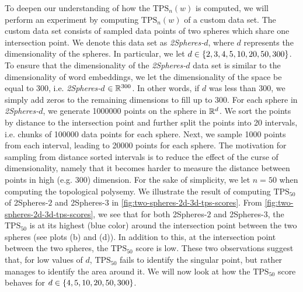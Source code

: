To deepen our understanding of how the $\text{TPS}_n(w)$ is computed, we will perform an experiment by computing $\text{TPS}_n(w)$ of a custom data set. The custom data set consists of sampled data points of two spheres which share one intersection point. We denote this data set as \textit{2Spheres-$d$}, where $d$ represents the dimensionality of the spheres. In particular, we let $d \in \left\{2, 3, 4, 5, 10, 20, 50, 300\right\}$. To ensure that the dimensionality of the \textit{2Spheres-$d$} data set is similar to the dimensionality of word embeddings, we let the dimensionality of the space be equal to 300, i.e. \textit{2Spheres-$d$} $\in \mathbb{R}^{300}$. In other words, if $d$ was less than 300, we simply add zeros to the remaining dimensions to fill up to 300. For each sphere in \textit{2Spheres-$d$}, we generate 1000000 points on the sphere in $\mathbb{R}^d$. We sort the points by distance to the intersection point and further split the points into 20 intervals, i.e. chunks of 100000 data points for each sphere. Next, we sample 1000 points from each interval, leading to 20000 points for each sphere. The motivation for sampling from distance sorted intervals is to reduce the effect of the curse of dimensionality, namely that it becomes harder to measure the distance between points in high (e.g. 300) dimension. For the sake of simplicity, we let $n=50$ when computing the topological polysemy. We illustrate the result of computing $\text{TPS}_{50}$ of 2Spheres-$2$ and 2Spheres-$3$ in \cref{fig:two-spheres-2d-3d-tps-scores}. From \cref{fig:two-spheres-2d-3d-tps-scores}, we see that for both 2Spheres-$2$ and 2Spheres-$3$, the $\text{TPS}_{50}$ is at its highest (blue color) around the intersection point between the two spheres (see plots (b) and (d)). In addition to this, at the intersection point between the two spheres, the $\text{TPS}_{50}$ score is low. These two observations suggest that, for low values of $d$, $\text{TPS}_{50}$ fails to identify the singular point, but rather manages to identify the area around it. We will now look at how the $\text{TPS}_{50}$ score behaves for $d \in \left\{4, 5, 10, 20, 50, 300\right\}$.
